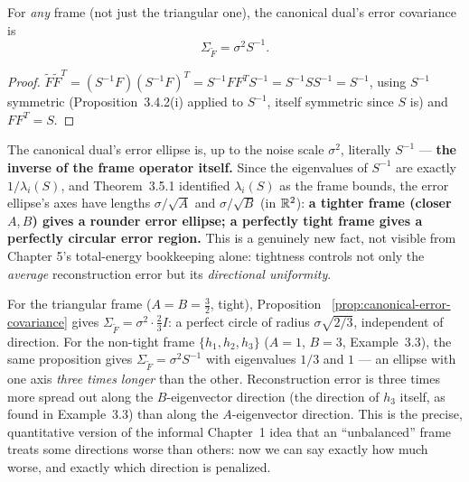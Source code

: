 \begin{proposition}
\label{prop:canonical-error-covariance}
For \emph{any} frame (not just the triangular one), the canonical
dual's error covariance is
\[
  \Sigma_{\tilde F} = \sigma^2 S^{-1}.
\]
\end{proposition}

\begin{proof}
$\tilde F\tilde F^T = (S^{-1}F)(S^{-1}F)^T = S^{-1}FF^TS^{-1} =
S^{-1}SS^{-1}=S^{-1}$, using $S^{-1}$ symmetric (Proposition~3.4.2(i)
applied to $S^{-1}$, itself symmetric since $S$ is) and $FF^T=S$.
\end{proof}

\begin{keyidea}
The canonical dual's error ellipse is, up to the noise scale $\sigma^2$,
literally $S^{-1}$ --- \textbf{the inverse of the frame operator
itself.} Since the eigenvalues of $S^{-1}$ are exactly $1/\lambda_i(S)$,
and Theorem~3.5.1 identified $\lambda_i(S)$ as the frame bounds, the
error ellipse's axes have lengths $\sigma/\sqrt{A}$ and $\sigma/\sqrt{B}$
(in $\mathbb{R}^2$): \textbf{a tighter frame (closer $A,B$) gives a rounder
error ellipse; a perfectly tight frame gives a perfectly circular
error region.} This is a genuinely new fact, not visible from Chapter
5's total-energy bookkeeping alone: tightness controls not only the
\emph{average} reconstruction error but its \emph{directional
uniformity}.
\end{keyidea}

\begin{examplebox}[title={Example 6.1: Circular vs.\ elliptical error regions}]
\label{ex:circular-vs-elliptical}
For the triangular frame ($A=B=\tfrac32$, tight), Proposition~
\ref{prop:canonical-error-covariance} gives $\Sigma_{\tilde F}=
\sigma^2\cdot\tfrac23I$: a perfect circle of radius $\sigma\sqrt{2/3}$,
independent of direction. For the non-tight frame $\{h_1,h_2,h_3\}$
($A=1$, $B=3$, Example~3.3), the same proposition gives
$\Sigma_{\tilde F}=\sigma^2S^{-1}$ with eigenvalues $1/3$ and $1$ ---
an ellipse with one axis \emph{three times longer} than the other.
Reconstruction error is three times more spread out along the
$B$-eigenvector direction (the direction of $h_3$ itself, as found in
Example~3.3) than along the $A$-eigenvector direction. This is the
precise, quantitative version of the informal Chapter~1 idea that an
``unbalanced'' frame treats some directions worse than others: now we
can say exactly how much worse, and exactly which direction is
penalized.
\end{examplebox}

